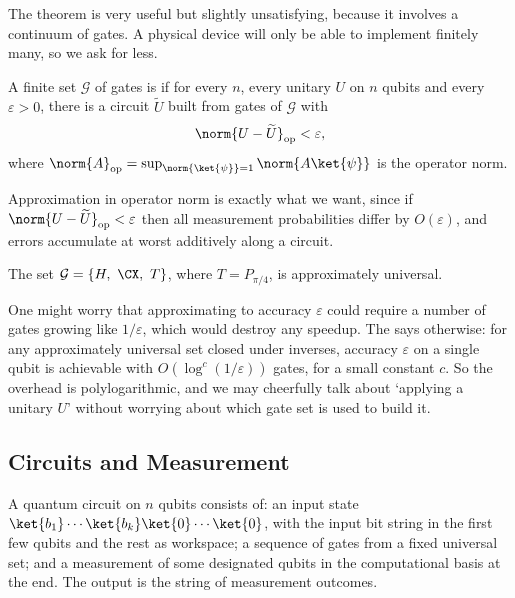 The theorem is very useful but slightly unsatisfying, because it involves a continuum of gates. A physical device will only be able to implement finitely many, so we ask for less.

\begin{definition}
	A finite set $\mathcal G$ of gates is  if for every $n$, every unitary $U$ on $n$ qubits and every $\varepsilon>0$, there is a circuit $\widetilde U$ built from gates of $\mathcal G$ with
	$$\norm{U - \widetilde U}_{\mathrm{op}} < \varepsilon,$$
	where $\norm{A}_{\mathrm{op}} = \sup_{\norm{\ket{\psi}}=1}\norm{A\ket{\psi}}$ is the operator norm.
\end{definition}

Approximation in operator norm is exactly what we want, since if $\norm{U - \widetilde U}_{\mathrm{op}} < \varepsilon$ then all measurement probabilities differ by $O(\varepsilon)$, and errors accumulate at worst additively along a circuit.

\begin{theorem}
	The set $\mathcal G = \{H,\ \CX,\ T\}$, where $T = P_{\pi/4}$, is approximately universal.
\end{theorem}

\begin{remark}
	One might worry that approximating to accuracy $\varepsilon$ could require a number of gates growing like $1/\varepsilon$, which would destroy any speedup. The  says otherwise: for any approximately universal set closed under inverses, accuracy $\varepsilon$ on a single qubit is achievable with $O(\log^c(1/\varepsilon))$ gates, for a small constant $c$. So the overhead is polylogarithmic, and we may cheerfully talk about `applying a unitary $U$' without worrying about which gate set is used to build it.
\end{remark}

\subsection{Circuits and Measurement}

A quantum circuit on $n$ qubits consists of: an input state $\ket{b_1}\cdots\ket{b_k}\ket{0}\cdots\ket{0}$, with the input bit string in the first few qubits and the rest as workspace; a sequence of gates from a fixed universal set; and a measurement of some designated qubits in the computational basis at the end. The output is the string of measurement outcomes.


